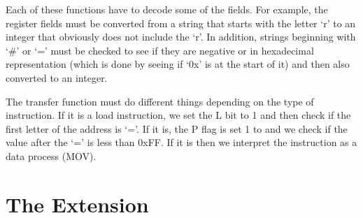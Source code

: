 \documentclass[a4paper]{article}
\begin{document}
Each of these functions have to decode some of the fields. For example, the register fields must be converted from a string that starts with the letter ‘r’ to an integer that obviously does not include the ‘r’. In addition, strings beginning with ‘\#’ or ‘=’ must be checked to see if they are negative or in hexadecimal representation (which is done by seeing if ‘0x’ is at the start of it) and then also converted to an integer.

The transfer function must do different things depending on the type of instruction. If it is a load instruction, we set the L bit to 1 and then check if the first letter of the address is ‘=’. If it is, the P flag is set 1 to and we check if the value after the ‘=’ is less than 0xFF. If it is then we interpret the instruction as a data process (MOV).

\section{The Extension}
\end{document}
